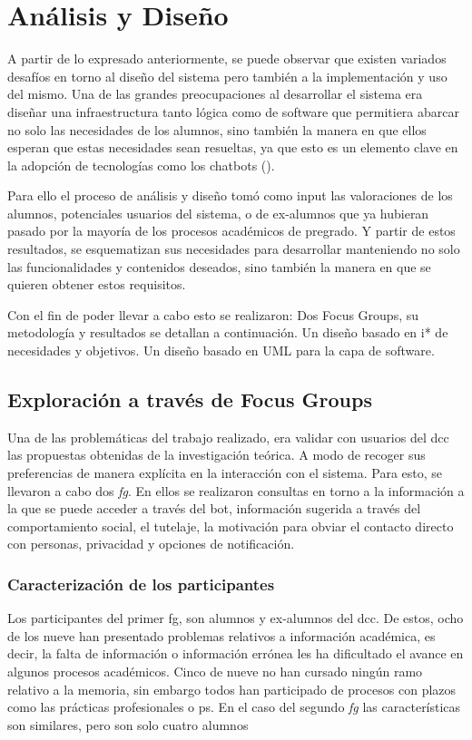 \chapter{Análisis y Diseño}
    \par A partir de lo expresado anteriormente, se puede observar que existen variados desafíos en torno al diseño del sistema pero también a la implementación y uso del mismo. Una de las grandes preocupaciones al desarrollar el sistema era diseñar una infraestructura tanto lógica como de software que permitiera abarcar no solo las necesidades de los alumnos, sino también la manera en que ellos esperan que estas necesidades sean resueltas, ya que esto es un elemento clave en la adopción de tecnologías como los chatbots ().
    \par Para ello el proceso de análisis y diseño tomó como input las valoraciones de los alumnos, potenciales usuarios del sistema, o de ex-alumnos que ya hubieran pasado por la mayoría de los procesos académicos de pregrado. Y partir de estos resultados, se esquematizan sus necesidades para  desarrollar manteniendo no solo las funcionalidades y contenidos deseados, sino también la manera en que se quieren obtener estos requisitos.
    \par Con el fin de poder llevar a cabo esto se realizaron: Dos Focus Groups, su metodología y resultados se detallan a continuación. Un diseño basado en i* de necesidades y objetivos. Un diseño basado en UML para la capa de software.

\section{Exploración a través de Focus Groups}
    \par Una de las problemáticas del trabajo realizado, era validar con usuarios del \acrshort{dcc} las propuestas obtenidas de la investigación teórica. A modo de recoger sus preferencias de manera explícita en la interacción con el sistema. Para esto, se llevaron a cabo dos \textit{\acrlong{fg}}. En ellos se realizaron consultas en torno a la información a la que se puede acceder a través del bot, información sugerida a través del comportamiento social, el tutelaje, la motivación para obviar el contacto directo con personas, privacidad y opciones de notificación.
    
    \subsection{Caracterización de los participantes}
    \par Los participantes del primer \acrshort{fg}, son alumnos y ex-alumnos del \acrshort{dcc}. De estos, ocho de los nueve han presentado problemas relativos a información académica, es decir, la falta de información o información errónea les ha dificultado el avance en algunos procesos académicos. Cinco de nueve no han cursado ningún ramo relativo a la memoria, sin embargo todos han participado de procesos con plazos como las prácticas profesionales o \acrlong{ps}. En el caso del segundo \textit{\acrlong{fg}} las características son similares, pero son solo cuatro alumnos
    
